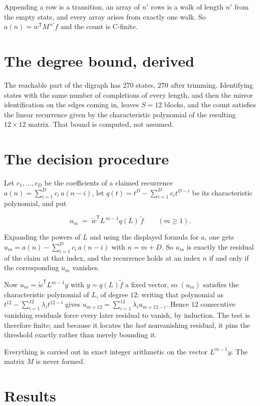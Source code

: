 \documentclass[11pt]{article}
\theoremstyle{definition}
\begin{document}
Appending a row is a transition, an array of $n'$ rows is a walk of length $n'$ from the empty state, and every array arises from exactly one walk. So $a(n) = w^{\mathsf T}M^{\,n'}f$ and the count is C-finite.

\section{The degree bound, derived}

The reachable part of the digraph has $270$ states, $270$ after trimming. Identifying states with the same number of completions of every length, and then the mirror identification on the edges coming in, leaves $S = 12$ blocks, and the count satisfies the linear recurrence given by the characteristic polynomial of the resulting $12\times12$ matrix. That bound is computed, not assumed.

\section{The decision procedure}

Let $c_1,\dots,c_D$ be the coefficients of a claimed recurrence $a(n) = \sum_{i=1}^{D} c_i\,a(n-i)$, let $q(t) = t^{D} - \sum_{i=1}^{D} c_i t^{D-i}$ be its characteristic polynomial, and put

\[u_m \;=\; \tilde w^{\mathsf T} L^{\,m-1} q(L)\,\tilde f \qquad (m \ge 1).\]

Expanding the powers of $L$ and using the displayed formula for $a$, one gets $u_m = a(n) - \sum_{i=1}^{D} c_i\,a(n-i)$ with $n = m + D$. So $u_m$ is exactly the residual of the claim at that index, and the recurrence holds at an index $n$ if and only if the corresponding $u_m$ vanishes.

Now $u_m = \tilde w^{\mathsf T} L^{m-1} y$ with $y = q(L)\tilde f$ a fixed vector, so $(u_m)$ satisfies the characteristic polynomial of $L$, of degree $12$: writing that polynomial as $t^{12} - \sum_{i=1}^{12} \lambda_i t^{12-i}$ gives $u_{m+12} = \sum_{i=1}^{12} \lambda_i u_{m+12-i}$. Hence $12$ consecutive vanishing residuals force every later residual to vanish, by induction. The test is therefore finite; and because it locates the {\itshape last} nonvanishing residual, it pins the threshold exactly rather than merely bounding it.

Everything is carried out in exact integer arithmetic on the vector $L^{m-1}y$. The matrix $M$ is never formed.

\section{Results}
\end{document}
